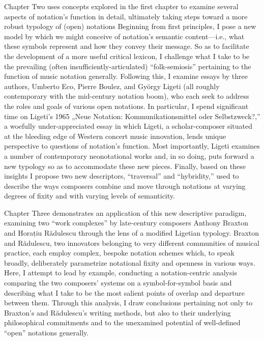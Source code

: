 Chapter Two uses concepts explored in the first chapter to examine several aspects of notation's function in detail, ultimately taking steps toward a more robust typology of (open) notations
Beginning from first principles, I pose a new model by which we might conceive of notation's semantic content---i.e., what these symbols represent and how they convey their message.
So as to facilitate the development of a more useful critical lexicon, I challenge what I take to be the prevailing (often insufficiently-articulated) ``folk-semiosis'' pertaining to the function of music notation generally.
Following this, I examine essays by three authors, Umberto Eco, Pierre Boulez, and Gy\"{o}rgy Ligeti (all roughly contemporary with the mid-century notation boom), who each seek to address the roles and goals of various open notations. 
In particular, I spend significant time on Ligeti's 1965 „Neue Notation: Kommunikationsmittel oder Selbstzweck?,” a woefully under-appreciated essay in which Ligeti, a scholar-composer situated at the bleeding edge of Western concert music innovation, lends unique perspective to questions of notation's function.
Most importantly, Ligeti examines a number of contemporary neonotational works and, in so doing, puts forward a new typology so as to accommodate these new pieces.
Finally, based on these insights I propose two new descriptors, ``traversal'' and ``hybridity,'' used to describe the ways composers combine and move through notations at varying degrees of fixity and with varying levels of semanticity. 

Chapter Three demonstrates an application of this new descriptive paradigm, examining two ``work complexes'' by late-century composers Anthony Braxton and Horațiu R\u{a}dulescu through the lens of a modified Ligetian typology.
Braxton and R\u{a}dulescu, two innovators belonging to very different communities of musical practice, each employ complex, bespoke notation schemes which, to speak broadly, deliberately parametrize notational fixity and openness in various ways.
Here, I attempt to lead by example, conducting a notation-centric analysis comparing the two composers' systems on a symbol-for-symbol basis and describing what I take to be the most salient points of overlap and departure between them.
Through this analysis, I draw conclusions pertaining not only to Braxton's and R\u{a}dulescu's writing methods, but also to their underlying philosophical commitments and to the unexamined potential of well-defined ``open'' notations generally.

